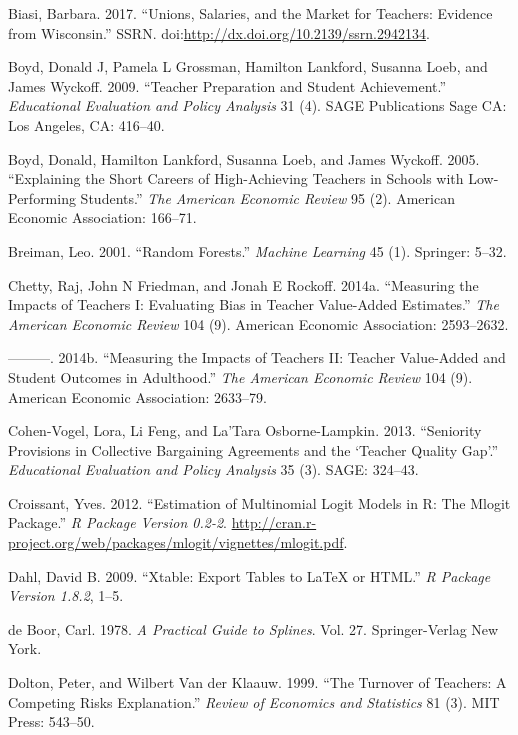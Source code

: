 \documentclass[12pt,]{article}
\begin{document}
\hypertarget{ref-biasi}{}
Biasi, Barbara. 2017. ``Unions, Salaries, and the Market for Teachers:
Evidence from Wisconsin.'' SSRN.
doi:\href{https://doi.org/http://dx.doi.org/10.2139/ssrn.2942134}{http://dx.doi.org/10.2139/ssrn.2942134}.

\hypertarget{ref-boyd2009}{}
Boyd, Donald J, Pamela L Grossman, Hamilton Lankford, Susanna Loeb, and
James Wyckoff. 2009. ``Teacher Preparation and Student Achievement.''
\emph{Educational Evaluation and Policy Analysis} 31 (4). SAGE
Publications Sage CA: Los Angeles, CA: 416--40.

\hypertarget{ref-boyd2005}{}
Boyd, Donald, Hamilton Lankford, Susanna Loeb, and James Wyckoff. 2005.
``Explaining the Short Careers of High-Achieving Teachers in Schools
with Low-Performing Students.'' \emph{The American Economic Review} 95
(2). American Economic Association: 166--71.

\hypertarget{ref-breiman}{}
Breiman, Leo. 2001. ``Random Forests.'' \emph{Machine Learning} 45 (1).
Springer: 5--32.

\hypertarget{ref-chettyI}{}
Chetty, Raj, John N Friedman, and Jonah E Rockoff. 2014a. ``Measuring
the Impacts of Teachers I: Evaluating Bias in Teacher Value-Added
Estimates.'' \emph{The American Economic Review} 104 (9). American
Economic Association: 2593--2632.

\hypertarget{ref-chettyII}{}
---------. 2014b. ``Measuring the Impacts of Teachers II: Teacher
Value-Added and Student Outcomes in Adulthood.'' \emph{The American
Economic Review} 104 (9). American Economic Association: 2633--79.

\hypertarget{ref-cohenvogel}{}
Cohen-Vogel, Lora, Li Feng, and La'Tara Osborne-Lampkin. 2013.
``Seniority Provisions in Collective Bargaining Agreements and the
`Teacher Quality Gap'.'' \emph{Educational Evaluation and Policy
Analysis} 35 (3). SAGE: 324--43.

\hypertarget{ref-croissant}{}
Croissant, Yves. 2012. ``Estimation of Multinomial Logit Models in R:
The Mlogit Package.'' \emph{R Package Version 0.2-2}.
\url{http://cran.r-project.org/web/packages/mlogit/vignettes/mlogit.pdf}.

\hypertarget{ref-dahl}{}
Dahl, David B. 2009. ``Xtable: Export Tables to LaTeX or HTML.'' \emph{R
Package Version 1.8.2}, 1--5.

\hypertarget{ref-deboor}{}
de Boor, Carl. 1978. \emph{A Practical Guide to Splines}. Vol. 27.
Springer-Verlag New York.

\hypertarget{ref-dolton}{}
Dolton, Peter, and Wilbert Van der Klaauw. 1999. ``The Turnover of
Teachers: A Competing Risks Explanation.'' \emph{Review of Economics and
Statistics} 81 (3). MIT Press: 543--50.
\end{document}
